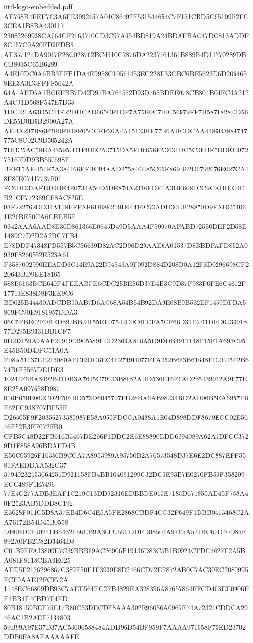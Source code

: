 \begin{filecontents*}[overwrite]{iitd-logo-embedded.pdf}
AE768B4EEF7C3A6FE3992457A04C86492E531544654C7F151CBD5C95109F2FC3CEA1B8BA430117
23082269938CA064CF2163710CD3C97A054BD819A24BDAFBAC47DC813ADDF8C157C0A20FD0FDB8
AF357124DA9017F28C028762BC4510C7876DA2237161361B889B4D11770289DBCB8035C65B6289
A4E10DC0A6BB3EFB1DA4E9958C10561453EC228E33CBC6BE5623D6D2064658EE3A3D3FFFF5642A
64A4AFD5A1BCEFBB7D42D97BA764562D93D765BDEE078CB804B04FC4A212A4C91D568F547E7D38
1DC021A63D5C44F22DDCAB665CF1DF7A75B0C710C56979FF7B5871828DD56DE55D0D6B2900A27A
AEBA237B86F2B9FB18F05CCEF36A4A15133BE77B6ABCDCAA4186B3884747775C8C02C9B505242A
7DBC5AC58BA435950D1F996CA3715DA5FB6656FA3631DC5C3FBE5BD93097275160DD9BB550698F
BEE15AED51E7A384166FFBC94AAD275846B85C65E869B62D2792676E027CA18F80E07417737F01
FC6DD33AFBD6BE4E0734A50D5DE870A2316FDE1A3BE6081CC9CABB034CB21CF772369CF8AC826E
93F222762DD34A118BFFAE6D68E210D64416C93ADD30BB28870D9EABC54061E26BE50CA6CBEB5E
0342AAA6AAD8E30D861366E0645D49D5AAA4F59070AFABD72550DEF2D58E1489C7D2D2A2DC7FB4
E78DDF47348FD557B5C56639D82AC2D96D29AAE6A01537D8BBDFAFD852A0939F8260552E523A61
F3587002990EEADD3C14E9A22D94543A0F092D884D208D0A12F3D0296698CF220643BD9EE18165
588E6163BCE640F4FEEABFE6CDC25BE56D37E4B3C9D37F983F6FE6C4612F17713E838D8F3EE9C6
BD025B44430ADCDB00AB7D6AC68A54B54B92DA9E08B9B532EF1459DFDA5869FC90E9181957DDA3
66C5FBE02E0BED892BB24155EE07542C0C6FCFA7CF66D31E2B1DFD023091877D295B9331BB1CF7
0D2D159A9AAB2191943905589FDD2360A816A5D9DDB4911148F15F1A693C95E45B50D40FC51A0A
F08A51137EE216080AFCE94C6EC4E2749D077FFA252B683B61648FD2E45F2B674B6F5567DE1DE3
10242F6BA8492B41DB3A7605C79433B8182ADD536E16F6AD285439912A9F77E8E25A097658D987
016B650E062CD2F5F49D573D6045797FD28BA6AB98234BD2AD06B5EA6957E6F62EC938F07DF55F
D26305F9F20356273385987E58A955FDCCA0488A1E04D898DDF8679ECC02E5646E52B3FF072FB0
CFB5C48D22FB616B3467DE266F1DDC2E6E88890BDD6394089A62A1DFCC3729D1F858A96BDAFD4B
E56C05926F16386B9CCA7A8953989A95750B2A76573548D37E6E2DC887EFF5581FAEDDAA532C37
37940232153664251D921158FB4BB164091299C32DC5E93B7E0270FB59F358209ECC489F1E5499
77E4C277ADB3EAF1C219C13DD92316EDBBDE013E7185D671955AD45F788A40F2523AB5DDD8C192
E3628F011C5D8A37EB4D6C4E5A5FE2868CBDF4CC32F649F1DBB0413468C2AA76172B54D45B0558
DB0BD2E9024EB5432F66CB9A30FC59FDDFD08502A97F5A571BC62D40D85F892A0FB2C82D3464D8
C01B9EFA33809F7C39BBB89AC26906B19136D83C3B1B0921CFDC4627F2A5BA081F8118CBA0E025
AED5F2136296867C389F50E1F3939E8D2466CD72EF872AB0C7AC30EC2080995FCF0AAE12FCF72A
1148EC66809DB93C7AEE564EC2FB4829EA328396A87657864FFCD403EE0906FE4BB4E40BD7E4FD
80B18159BEF75E17B80C53DECDF8AAA302E96056A0967E74A72321CDDCA2946AC1B2AEF7134803
59B99A97E37D37AC53606588484ADD96D54BF959F7AAAA971058F75ED23702DDB0FA8AEAAAAAFE

\end{filecontents*}

